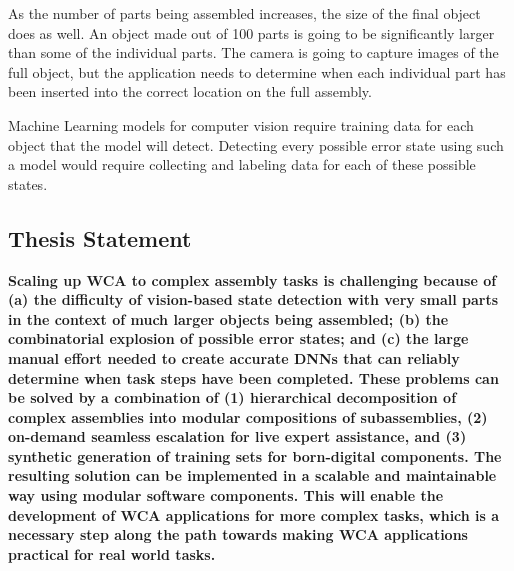 As the number of parts being assembled increases, the size of the final object
does as well. An object made out of 100 parts is going to be significantly
larger than some of the individual parts. The camera is going to capture images
of the full object, but the application needs to determine when each individual
part has been inserted into the correct location on the full assembly.

Machine Learning models for computer vision require training data for each
object that the model will detect. Detecting every possible error state using
such a model would require collecting and labeling data for each of these
possible states.

\subsection{Thesis Statement}

\textbf{
  Scaling up WCA to complex assembly tasks is challenging because of
  (a) the difficulty of
  vision-based state detection with very small parts in the context of much
  larger objects being assembled; (b) the combinatorial explosion
  of possible error states; and (c) the large manual effort needed to create
  accurate DNNs that can reliably determine when task steps have been completed.
  These problems can be solved by a combination of (1) hierarchical
  decomposition of
  complex assemblies into modular compositions of subassemblies, (2) on-demand
  seamless
  escalation for live expert assistance, and (3) synthetic generation of
  training
  sets for born-digital components. The resulting solution can be implemented in
  a scalable and maintainable way using modular software components.
  This will enable the development of WCA applications for more complex tasks,
  which is a necessary step along the path towards making WCA applications
  practical for real world tasks.
}
